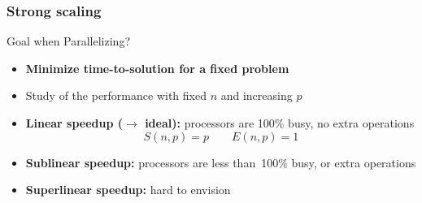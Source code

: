 \documentclass[xcolor={x11names,svgnames,psnames}]{beamer}
\begin{document}
\begin{frame}
\frametitle{Strong scaling}

\begin{alertblock}{Goal when Parallelizing?}
  \begin{itemize}
  \item \textbf{Minimize time-to-solution for a fixed problem}
  \item[$\Rightarrow$] Study of the performance with fixed $n$ and increasing $p$
  \end{itemize}
\end{alertblock}

\medskip

\begin{itemize} 
\item  \textbf{Linear speedup ($\rightarrow$ ideal):} 
processors are 100\% busy, no extra operations
\[
  S(n,p)  = p \qquad E(n,p)  = 1
\]

\medskip

\item \textbf{Sublinear speedup:}
processors are less than~100\% busy, or extra operations 

\medskip

\item {\bf Superlinear speedup:} hard to envision 


\end{itemize}
\end{frame}
\end{document}
